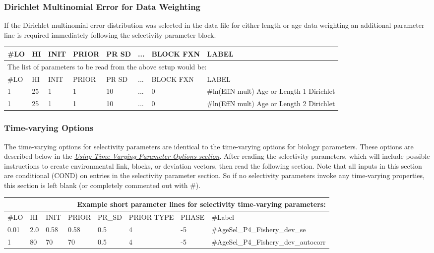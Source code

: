 \hypertarget{Dirichletparameter}{}
\subsubsection{Dirichlet Multinomial Error for Data Weighting}
If the Dirichlet multinomial error distribution was selected in the data file for either length or age data weighting an additional parameter line is required immediately following the selectivity parameter block. 

\begin{center}
	\begin{longtable}{p{1.1cm} p{1.1cm} p{1.2cm} p{1.2cm} p{1.5cm} p{1.1cm} p{1.5cm} p{4.3cm}}
		\hline
		\#LO & HI & INIT & PRIOR & PR SD & ... & BLOCK FXN & LABEL \\
		\hline		
		\multicolumn{8}{l}{The list of parameters to be read from the above setup would be:}\\
		\hline
		\#LO & HI & INIT & PRIOR & PR SD & ... & BLOCK FXN & LABEL \\
		\hline
		1    & 25 & 1 & 1 & 10 & ...  & 0   & \#ln(EffN mult) Age or Length 1 Dirichlet\\
		1    & 25 & 1 & 1 & 10 & ...  & 0   & \#ln(EffN mult) Age or Length 2 Dirichlet\\
		\hline
	\end{longtable}
\end{center} 

\subsubsection{Time-varying Options}
The time-varying options for selectivity parameters are identical to the time-varying options for biology parameters.  These options are described below in the \hyperlink{TVpara}{\textit{Using Time-Varying Parameter Options section}}.  After reading the selectivity parameters, which will include possible instructions to create environmental link, blocks, or deviation vectors, then read the following section.  Note that all inputs in this section are conditional (COND) on entries in the selectivity parameter section.  So if no selectivity parameters invoke any time-varying properties, this section is left blank (or completely commented out with \#).

\begin{center}
	\begin{longtable}{p{0.8cm} p{0.8cm} p{1cm} p{0.8cm} p{1.75cm}p{1cm} p{1.2cm} p{5.2cm}}
		\multicolumn{8}{r}{Example short parameter lines for selectivity time-varying parameters:}\\
		\hline
		\#LO & HI & INIT & PRIOR & PR\_SD  & PRIOR TYPE & PHASE& \#Label \\
		\hline
		0.01 & 2.0 & 0.58 & 0.58 &  0.5  & 4 & -5 & \#AgeSel\_P4\_Fishery\_dev\_se \\
		1    & 80  & 70   & 70   &  0.5  & 4 & -5 & \#AgeSel\_P4\_Fishery\_dev\_autocorr \\
		\hline
	\end{longtable}
\end{center}


